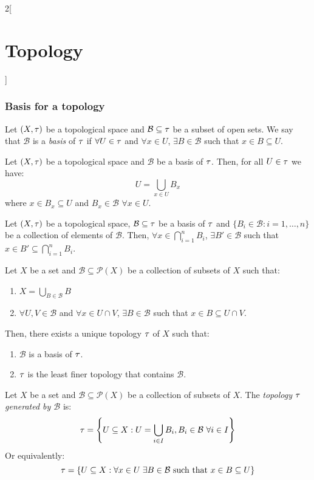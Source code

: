 \documentclass[../../../main.tex]{subfiles}
\begin{document}
\begin{multicols}{2}[\section{Topology}]
  \subsubsection{Basis for a topology}
  \begin{definition}
    Let $(X,\tau)$ be a topological space and $\mathcal{B}\subseteq\tau$ be a subset of open sets. We say that $\mathcal{B}$ is a \textit{basis} of $\tau$ if $\forall U\in\tau$ and $\forall x\in U$, $\exists B\in\mathcal{B}$ such that $x\in B\subseteq U$.
  \end{definition}
  \begin{prop}
    Let $(X,\tau)$ be a topological space and $\mathcal{B}$ be a basis of $\tau$. Then, for all $U\in\tau$ we have: $$U=\bigcup_{x\in U}B_x$$ where $x\in B_x\subseteq U$ and $B_x\in\mathcal{B}$ $\forall x\in U$.
  \end{prop}
  \begin{lemma}
    Let $(X,\tau)$ be a topological space, $\mathcal{B}\subseteq\tau$ be a basis of $\tau$ and $\{B_i\in\mathcal{B}:i=1,\ldots,n\}$ be a collection of elements of $\mathcal{B}$. Then, $\forall x\in\bigcap_{i=1}^nB_i$, $\exists B'\in\mathcal{B}$ such that $x\in B'\subseteq\bigcap_{i=1}^nB_i$.
  \end{lemma}
  \begin{prop}
    Let $X$ be a set and $\mathcal{B}\subseteq\mathcal{P}(X)$ be a collection of subsets of $X$ such that:
    \begin{enumerate}
      \renewcommand{\labelenumi}{\alph{enumi})}
      \item $\displaystyle X=\bigcup_{B\in\mathcal{B}} B$
      \item $\forall U,V\in\mathcal{B}$ and  $\forall x\in U\cap V$, $\exists B\in\mathcal{B}$ such that $x\in B\subseteq U\cap V$.
    \end{enumerate}
    Then, there exists a unique topology $\tau$ of $X$ such that:
    \begin{enumerate}
      \item $\mathcal{B}$ is a basis of $\tau$.
      \item $\tau$ is the least finer topology that contains $\mathcal{B}$.
    \end{enumerate}
  \end{prop}
  \begin{definition}
    Let $X$ be a set and $\mathcal{B}\subseteq\mathcal{P}(X)$ be a collection of subsets of $X$. The \textit{topology $\tau$ generated by $\mathcal{B}$} is: $$\tau=\left\{U\subseteq X:U=\bigcup_{i\in I}B_i, B_i\in \mathcal{B}\ \forall i\in I\right\}$$ Or equivalently: $$\tau=\left\{U\subseteq X:\forall x\in U\;\exists B\in\mathcal{B}\text{ such that }x\in B\subseteq U\right\}$$

\end{definition}
\end{multicols}
\end{document}
